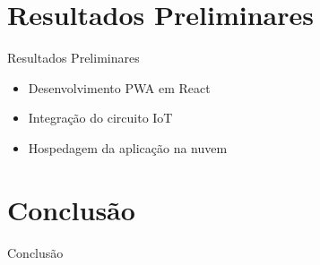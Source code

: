 \documentclass{beamer}
\begin{document}
\section{Resultados Preliminares}
\begin{frame}{Resultados Preliminares}
\justifying
\begin{itemize}
    \item Desenvolvimento PWA em React
    \item Integração do circuito IoT
    \item Hospedagem da aplicação na nuvem
\end{itemize}
\end{frame}

\section{Conclusão}
\begin{frame}{Conclusão}
\justifying
\end{frame}
\end{document}
